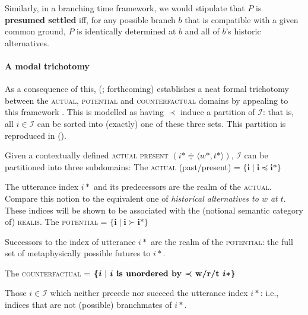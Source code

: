 \documentclass[11pt,dvipsnames]{report}
\begin{document}
\xe

\noindent Similarly, in a branching time framework, we would stipulate that $ P $ is \textbf{presumed settled} iff, for any possible branch $ b $ that is compatible with a given common ground, $ P $ is identically determined at $ b $ and all of $ b $'s historic alternatives.



\paragraph{A modal trichotomy}\label{vP-trich} As a consequence of this,  \citeauthor{VonPrince2017a} (\citeyear{VonPrince2017a,VonPrince2019}; \citealp{VonPrincea} forthcoming) establishes a neat formal trichotomy between the \textsc{actual, potential} and \textsc{counterfactual} domains by appealing to this framework \citetext{\citealp[see also][41]{Rumberg2016a}, \citeyear{Rumberg2019}}. This is modelled as having $ \boldsymbol{\prec} $ induce a partition of $ \mathcal I $: that is, all $ i\in\mathcal I $ can be sorted into (exactly) one of these three sets. This partition is reproduced in ().

\pex Given a contextually defined \textsc{actual present} $( i*\doteqdot\langle w*,t*\rangle )$, $ \mathcal I $ can be partitioned into three subdomains:
\a The \textsc{actual} (past/present) = $\boldsymbol{ \{i\mid i\preccurlyeq i*\} }$

The utterance index $ i* $ and its predecessors are the realm of the \textsc{actual}.
Compare this notion to the equivalent one of \textit{historical alternatives to $ w $ at $ t $}. These indices will be shown to be associated with the (notional semantic category of) \textsc{realis}.
\a The \textsc{potential} = $ \boldsymbol{\{i\mid i\succ i*\} }$

Successors to the index of utterance $ i* $ are the realm of the \textsc{potential}: the full set of metaphysically possible futures to $ i* $.

\a The \textsc{counterfactual} = $\boldsymbol{ \{i\mid i \textbf{ is unordered by $ \boldsymbol\prec $ w/r/t } i* \}}$

Those $ i\in\mathcal I $ which neither precede nor succeed the utterance index $ i* $: i.e., indices that are not (possible) branchmates of $ i* $.
\end{document}
